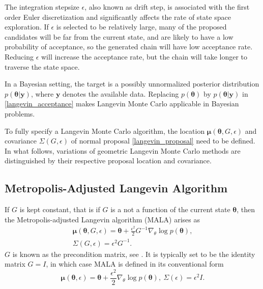 \documentclass[twoside,11pt]{article}
\begin{document}
The integration stepsize $\epsilon$, also known as drift step, is associated with the first order Euler discretization and 
significantly affects the rate of state space exploration. If $\epsilon$ is selected to be relatively large, many of the 
proposed candidates will be far from the current state, and are likely to have a low probability of acceptance, so the 
generated chain will have low acceptance rate. Reducing $\epsilon$ will increase the acceptance rate, but the chain will 
take longer to traverse the state space.

In a Bayesian setting, the target is a possibly unnormalized posterior distribution $p(\boldsymbol{\theta}|\mathbf{y})$,
where $\mathbf{y}$ denotes the available data. Replacing $p(\boldsymbol{\theta})$ by $p(\boldsymbol{\theta}|\mathbf{y})$ in
\eqref{langevin_acceptance} makes Langevin Monte Carlo applicable in Bayesian problems.

To fully specify a Langevin Monte Carlo algorithm, the location $\boldsymbol{\mu}(\boldsymbol{\theta}, G, \epsilon)$ and 
covariance $\Sigma(G, \epsilon)$ of normal proposal \eqref{langevin_proposal} need to be defined. In what follows, 
variations of geometric Langevin Monte Carlo methods are distinguished by their respective proposal location and covariance.

\subsection{Metropolis-Adjusted Langevin Algorithm}
\label{mala_section}

If $G$ is kept constant, that is if $G$ is a not a function of the current state $\boldsymbol{\theta}$, then the
Metropolis-adjusted Langevin algorithm (MALA) arises as
\begin{eqnarray}
\label{mala_location}
\boldsymbol{\mu}(\boldsymbol{\theta}, G, \epsilon) = 
\boldsymbol{\theta}+\frac{\epsilon^2}{2}G^{-1}\nabla_{\theta}\log{p(\boldsymbol{\theta})},\\
\label{mala_covariance}
\Sigma(G, \epsilon) = \epsilon^2 G^{-1}.
\end{eqnarray}
$G$ is known as the precondition matrix, see \cite{rob_stra__lan}. It is typically set to be the identity matrix $G=I$, in
which case MALA is defined in its conventional form
\begin{equation}
\label{mala_location_covariance_identity}
\boldsymbol{\mu}(\boldsymbol{\theta}, \epsilon) = 
\boldsymbol{\theta}+\frac{\epsilon^2}{2}\nabla_{\theta}\log{p(\boldsymbol{\theta})},~
\Sigma(\epsilon) = \epsilon^2 I.
\end{equation}
\end{document}
